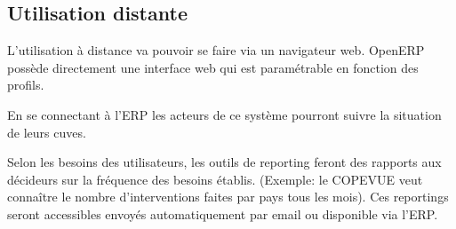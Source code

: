 \subsection{Utilisation distante}

L'utilisation à distance va pouvoir se faire via un navigateur web. OpenERP
possède directement une interface web qui est paramétrable en fonction des
profils.

En se connectant à l'ERP les acteurs de ce système pourront suivre la
situation de leurs cuves.

Selon les besoins des utilisateurs, les outils de reporting feront des
rapports aux décideurs sur la fréquence des besoins établis. (Exemple: le
COPEVUE veut connaître le nombre d'interventions faites par pays tous les
mois). Ces reportings seront accessibles envoyés automatiquement par email
ou disponible via l'ERP. 
